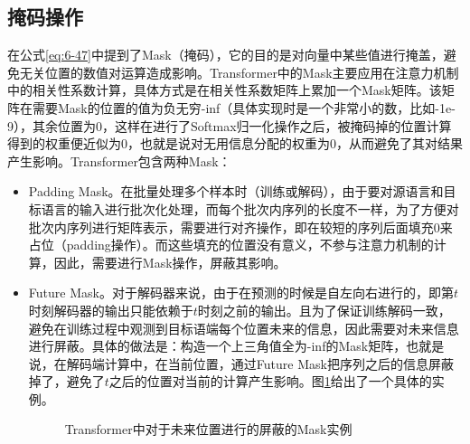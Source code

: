 
\subsection{掩码操作}

\parinterval 在公式\ref{eq:6-47}中提到了Mask（掩码），它的目的是对向量中某些值进行掩盖，避免无关位置的数值对运算造成影响。Transformer中的Mask主要应用在注意力机制中的相关性系数计算，具体方式是在相关性系数矩阵上累加一个Mask矩阵。该矩阵在需要Mask的位置的值为负无穷-inf（具体实现时是一个非常小的数，比如-1e-9），其余位置为0，这样在进行了Softmax归一化操作之后，被掩码掉的位置计算得到的权重便近似为0，也就是说对无用信息分配的权重为0，从而避免了其对结果产生影响。Transformer包含两种Mask：

\begin{itemize}
\vspace{0.5em}
\item Padding Mask。在批量处理多个样本时（训练或解码），由于要对源语言和目标语言的输入进行批次化处理，而每个批次内序列的长度不一样，为了方便对批次内序列进行矩阵表示，需要进行对齐操作，即在较短的序列后面填充0来占位（padding操作）。而这些填充的位置没有意义，不参与注意力机制的计算，因此，需要进行Mask操作，屏蔽其影响。
\vspace{0.5em}
\item Future Mask。对于解码器来说，由于在预测的时候是自左向右进行的，即第$t$时刻解码器的输出只能依赖于$t$时刻之前的输出。且为了保证训练解码一致，避免在训练过程中观测到目标语端每个位置未来的信息，因此需要对未来信息进行屏蔽。具体的做法是：构造一个上三角值全为-inf的Mask矩阵，也就是说，在解码端计算中，在当前位置，通过Future Mask把序列之后的信息屏蔽掉了，避免了$t$之后的位置对当前的计算产生影响。图\ref{fig:6-47}给出了一个具体的实例。

\begin{figure}[htp]
\centering

\caption{Transformer中对于未来位置进行的屏蔽的Mask实例}
\label{fig:6-47}
\end{figure}

\vspace{0.5em}
\end{itemize}

